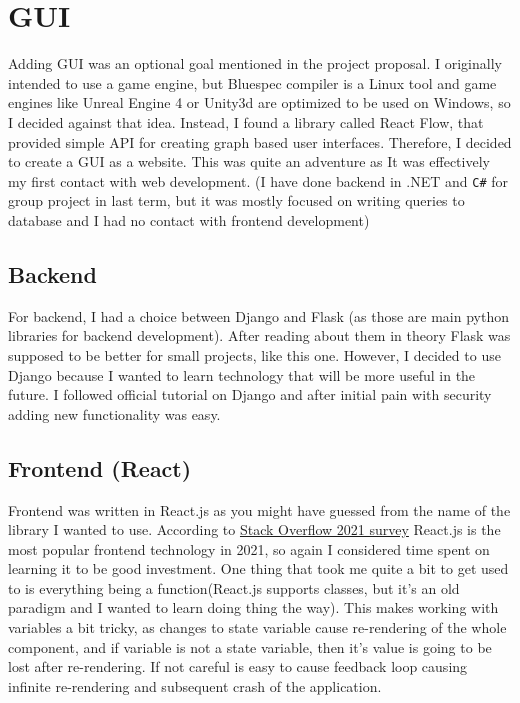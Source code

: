 \documentclass[12pt]{report}
\begin{document}
\section{GUI}
Adding GUI was an optional goal mentioned in the project proposal. I originally intended to use a game engine, but Bluespec compiler is a Linux tool and game engines like Unreal Engine 4 or Unity3d are optimized to be used on Windows, so I decided against that idea. Instead, I found a library called React Flow, that provided simple API for creating graph based user interfaces. Therefore, I decided to create a GUI as a website. This was quite an adventure as It was effectively my first contact with web development. (I have done backend in .NET and \verb!C#! for group project in last term, but it was mostly focused on writing queries to database and I had no contact with frontend development)

\subsection{Backend}
For backend, I had a choice between Django and Flask (as those are main python libraries for backend development). After reading about them in theory Flask was supposed to be better for small projects, like this one. However, I decided to use Django because I wanted to learn technology that will be more useful in the future. I followed official tutorial on Django and after initial pain with security adding new functionality was easy.

\subsection{Frontend (React)}
Frontend was written in React.js as you might have guessed from the name of the library I wanted to use. According to \href{https://insights.stackoverflow.com/survey/2021#most-popular-technologies-webframe}{Stack Overflow 2021 survey} React.js is the most popular frontend technology in 2021, so again I considered time spent on learning it to be good investment. One thing that took me quite a bit to get used to is everything being a function(React.js supports classes, but it's an old paradigm and I wanted to learn doing thing the  way). This makes working with variables a bit tricky, as changes to state variable cause re-rendering of the whole component, and if variable is not a state variable, then it's value is going to be lost after re-rendering. If not careful is easy to cause feedback loop causing infinite re-rendering and subsequent crash of the application. 
\end{document}
